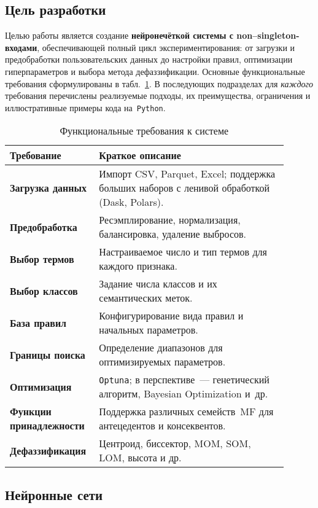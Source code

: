 \subsection{Цель разработки}
\label{subsec:goal}

Целью работы является создание \textbf{нейронечёткой системы с non--singleton-входами}, обеспечивающей полный цикл экспериментирования: от загрузки и предобработки пользовательских данных до настройки правил, оптимизации гиперпараметров и выбора метода дефаззификации.  
Основные функциональные требования сформулированы в табл.~\ref{tab:req}. В последующих подразделах для \emph{каждого} требования перечислены реализуемые подходы, их преимущества, ограничения и иллюстративные примеры кода на~\texttt{Python}.

\begin{table}[h]
\centering\small
\caption{Функциональные требования к системе}
\label{tab:req}
\begin{tabular}{p{0.25\linewidth}p{0.65\linewidth}}
\toprule
Требование & Краткое описание \\
\midrule
\textbf{Загрузка данных} & Импорт CSV, Parquet, Excel; поддержка больших наборов с ленивой обработкой (Dask, Polars).\\
\textbf{Предобработка} & Ресэмплирование, нормализация, балансировка, удаление выбросов.\\
\textbf{Выбор термов} & Настраиваемое число и тип термов для каждого признака.\\
\textbf{Выбор классов} & Задание числа классов и их семантических меток.\\
\textbf{База правил} & Конфигурирование вида правил и начальных параметров.\\
\textbf{Границы поиска} & Определение диапазонов для оптимизируемых параметров.\\
\textbf{Оптимизация} & \texttt{Optuna}; в перспективе~--- генетический алгоритм, Bayesian Optimization и~др.\\
\textbf{Функции принадлежности} & Поддержка различных семейств~MF для антецедентов и консеквентов.\\
\textbf{Дефаззификация} & Центроид, биссектор, MOM, SOM, LOM, высота и др. \\
\bottomrule
\end{tabular}
\end{table}



\subsection{Нейронные сети}
\label{subsec:neural_nets}

